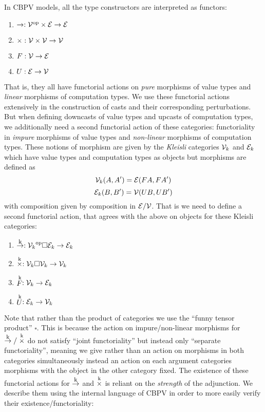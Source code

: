 In CBPV models, all the type constructors are interpreted as functors:
\begin{enumerate}
\item $\to : {\mathcal{V}}^{\textrm{op}} \times \mathcal{E} \to \mathcal{E}$
\item $\times : \mathcal{V} \times \mathcal{V} \to \mathcal{V}$
\item $F : \mathcal{V} \to \mathcal{E}$
\item $U : \mathcal{E} \to \mathcal{V}$
\end{enumerate}
That is, they all have functorial actions on \emph{pure} morphisms of
value types and \emph{linear} morphisms of computation types.
%
We use these functorial actions extensively in the construction of
casts and their corresponding perturbations. But when defining
downcasts of value types and upcasts of computation types, we
additionally need a second functorial action of these categories:
functoriality in \emph{impure} morphisms of value types and
\emph{non-linear} morphisms of computation types. These notions of
morphism are given by the \emph{Kleisli} categories $\mathcal{V}_k$ and
$\mathcal{E}_k$ which have value types and computation types as objects but
morphisms are defined as
\[ \mathcal{V}_k(A,A') = \mathcal{E}(F A, FA')\]
\[ \mathcal{E}_k(B,B') = \mathcal{V}(U B, U B')\]
with composition given by composition in $\mathcal{E}/\mathcal{V}$.  That is we
need to define a second functorial action, that agrees with the above
on objects for these Kleisli categories:
\begin{enumerate}
\item $\mathrel{\mathop{\to}\limits^{\textrm{\footnotesize k}}} : {\mathcal{V}_k}^{\textrm{op}} \square \mathcal{E}_k \to \mathcal{E}_k$
\item $\mathrel{\mathop{\times}\limits^{\textrm{k}}} : \mathcal{V}_k \square \mathcal{V}_k \to \mathcal{V}_k$
\item $\mathrel{\mathop{F}\limits^{\textrm{k}}} : \mathcal{V}_k \to \mathcal{E}_k$
\item $\mathrel{\mathop{U}\limits^{\textrm{k}}} : \mathcal{E}_k \to \mathcal{V}_k$
\end{enumerate}
Note that rather than the product of categories we use the ``funny
tensor product'' $\square$. This is because the action on
impure/non-linear morphisms for $\mathrel{\mathop{\to}\limits^{\textrm{\footnotesize k}}}/\mathrel{\mathop{\times}\limits^{\textrm{k}}}$ do not satisfy ``joint
functoriality'' but instead only ``separate functoriality'', meaning
we give rather than an action on morphisms in both categories
simultaneously instead an action on each argument categories morphisms
with the object in the other category fixed. The existence of these
functorial actions for $\mathrel{\mathop{\to}\limits^{\textrm{\footnotesize k}}}$ and $\mathrel{\mathop{\times}\limits^{\textrm{k}}}$ is reliant on the
\emph{strength} of the adjunction. We describe them using the internal
language of CBPV in order to more easily verify their
existence/functoriality:
